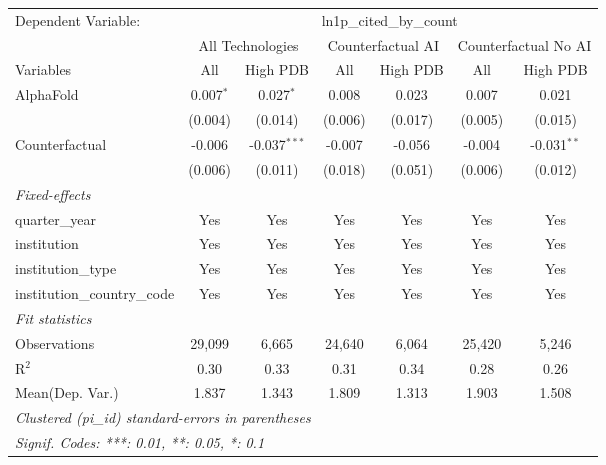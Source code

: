 \begingroup
\centering
\begin{tabular}{lcccccc}
   \tabularnewline \midrule \midrule
   Dependent Variable: & \multicolumn{6}{c}{ln1p\_cited\_by\_count}\\
 & \multicolumn{2}{c}{All Technologies} & \multicolumn{2}{c}{Counterfactual AI} & \multicolumn{2}{c}{Counterfactual No AI} \\
\cmidrule(lr){1-1}\cmidrule(lr){2-3} \cmidrule(lr){4-5} \cmidrule(lr){6-7}
Variables & \multicolumn{1}{c}{All} & \multicolumn{1}{c}{High PDB} & \multicolumn{1}{c}{All} & \multicolumn{1}{c}{High PDB} & \multicolumn{1}{c}{All} & \multicolumn{1}{c}{High PDB} \\
\cmidrule(lr){1-1}\cmidrule(lr){2-2} \cmidrule(lr){3-3} \cmidrule(lr){4-4} \cmidrule(lr){5-5} \cmidrule(lr){6-6} \cmidrule(lr){7-7}
   AlphaFold                    & 0.007$^{*}$ & 0.027$^{*}$    & 0.008   & 0.023   & 0.007   & 0.021\\   
                                & (0.004)     & (0.014)        & (0.006) & (0.017) & (0.005) & (0.015)\\   
   Counterfactual               & -0.006      & -0.037$^{***}$ & -0.007  & -0.056  & -0.004  & -0.031$^{**}$\\   
                                & (0.006)     & (0.011)        & (0.018) & (0.051) & (0.006) & (0.012)\\   
   \midrule
   \emph{Fixed-effects}\\
   quarter\_year                & Yes         & Yes            & Yes     & Yes     & Yes     & Yes\\  
   institution                  & Yes         & Yes            & Yes     & Yes     & Yes     & Yes\\  
   institution\_type            & Yes         & Yes            & Yes     & Yes     & Yes     & Yes\\  
   institution\_country\_code   & Yes         & Yes            & Yes     & Yes     & Yes     & Yes\\  
   \midrule
   \emph{Fit statistics}\\
   Observations                 & 29,099      & 6,665          & 24,640  & 6,064   & 25,420  & 5,246\\  
   R$^2$                        & 0.30        & 0.33           & 0.31    & 0.34    & 0.28    & 0.26\\  
Mean(Dep. Var.) & 1.837 & 1.343 & 1.809 & 1.313 & 1.903 & 1.508 \\
   \midrule \midrule
   \multicolumn{7}{l}{\emph{Clustered (pi\_id) standard-errors in parentheses}}\\
   \multicolumn{7}{l}{\emph{Signif. Codes: ***: 0.01, **: 0.05, *: 0.1}}\\
\end{tabular}
\par\endgroup
